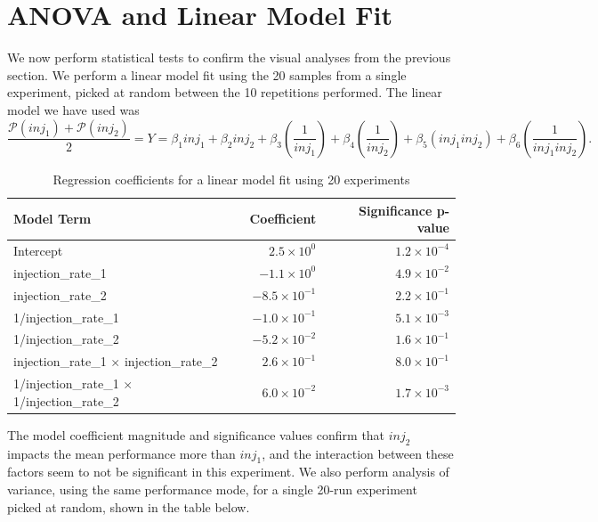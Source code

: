 \documentclass[a4paper]{article}
\begin{document}
\section{ANOVA and Linear Model Fit}
\label{sec:orgd3fd749}
We  now perform  statistical  tests  to confirm  the  visual  analyses from  the
previous section.   We perform a  linear model fit using  the 20 samples  from a
single experiment, picked  at random between the 10  repetitions performed.  The
linear model we have used was
\begin{equation*}
\dfrac{\mathcal{P}(inj_1) + \mathcal{P}(inj_2)}{2} =
Y = \beta_{1}inj_1 +
\beta_{2}inj_2 +
\beta_{3}\left(\dfrac{1}{inj_1}\right) +
\beta_{4}\left(\dfrac{1}{inj_2}\right) +
\beta_{5}\left(inj_{1}inj_{2}\right) +
\beta_{6}\left(\dfrac{1}{inj_{1}inj_2}\right)\text{.}
\end{equation*}


\begin{table}[ht]
\centering
\caption{Regression coefficients for a linear model fit using 20 experiments}
\begin{tabular}{lrr}
  \toprule
Model Term & Coefficient & Significance p-value \\
  \midrule
Intercept & $2.5 \times 10^{0}$ & $1.2 \times 10^{-4}$ \\
  injection\_rate\_1 & $-1.1 \times 10^{0}$ & $4.9 \times 10^{-2}$ \\
  injection\_rate\_2 & $-8.5 \times 10^{-1}$ & $2.2 \times 10^{-1}$ \\
  1/injection\_rate\_1 & $-1.0 \times 10^{-1}$ & $5.1 \times 10^{-3}$ \\
  1/injection\_rate\_2 & $-5.2 \times 10^{-2}$ & $1.6 \times 10^{-1}$ \\
  injection\_rate\_1 $\times$ injection\_rate\_2 & $2.6 \times 10^{-1}$ & $8.0 \times 10^{-1}$ \\
  1/injection\_rate\_1 $\times$ 1/injection\_rate\_2 & $6.0 \times 10^{-2}$ & $1.7 \times 10^{-3}$ \\
   \bottomrule
\end{tabular}
\end{table}

The  model coefficient  magnitude and  significance values  confirm that  \(inj_2\)
impacts the mean performance more than \(inj_1\), and the interaction between these
factors seem to not be significant  in this experiment. We also perform analysis
of variance,  using the same  performance mode,  for a single  20-run experiment
picked at random, shown in the table below.
\end{document}
